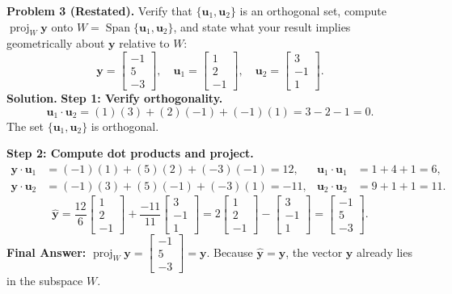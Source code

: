 \documentclass[11pt, letterpaper]{article}
\theoremstyle{definition}
\theoremstyle{remark}
\begin{document}
\medskip
\textbf{Problem 3 (Restated).} Verify that $\{\mathbf{u}_1, \mathbf{u}_2\}$ is an orthogonal set, compute $\operatorname{proj}_W \mathbf{y}$ onto $W = \operatorname{Span}\{\mathbf{u}_1, \mathbf{u}_2\}$, and state what your result implies geometrically about $\mathbf{y}$ relative to $W$:
\[
\mathbf{y} = \begin{bmatrix} -1 \\ 5 \\ -3 \end{bmatrix}, \quad \mathbf{u}_1 = \begin{bmatrix} 1 \\ 2 \\ -1 \end{bmatrix}, \quad \mathbf{u}_2 = \begin{bmatrix} 3 \\ -1 \\ 1 \end{bmatrix}.
\]
\textbf{Solution.}
\textbf{Step 1: Verify orthogonality.}
\[
\mathbf{u}_1 \cdot \mathbf{u}_2 = (1)(3) + (2)(-1) + (-1)(1) = 3 - 2 - 1 = 0.
\]
The set $\{\mathbf{u}_1, \mathbf{u}_2\}$ is orthogonal.

\textbf{Step 2: Compute dot products and project.}
\begin{align*}
\mathbf{y} \cdot \mathbf{u}_1 &= (-1)(1) + (5)(2) + (-3)(-1) = 12, & \mathbf{u}_1 \cdot \mathbf{u}_1 &= 1 + 4 + 1 = 6, \\
\mathbf{y} \cdot \mathbf{u}_2 &= (-1)(3) + (5)(-1) + (-3)(1) = -11, & \mathbf{u}_2 \cdot \mathbf{u}_2 &= 9 + 1 + 1 = 11.
\end{align*}
\[
\hat{\mathbf{y}} = \frac{12}{6}\begin{bmatrix} 1 \\ 2 \\ -1 \end{bmatrix} + \frac{-11}{11}\begin{bmatrix} 3 \\ -1 \\ 1 \end{bmatrix} = 2\begin{bmatrix} 1 \\ 2 \\ -1 \end{bmatrix} - \begin{bmatrix} 3 \\ -1 \\ 1 \end{bmatrix} = \begin{bmatrix} -1 \\ 5 \\ -3 \end{bmatrix}.
\]
\textbf{Final Answer:} $\operatorname{proj}_W \mathbf{y} = \begin{bmatrix} -1 \\ 5 \\ -3 \end{bmatrix} = \mathbf{y}$. Because $\hat{\mathbf{y}} = \mathbf{y}$, the vector $\mathbf{y}$ already lies in the subspace $W$.
\end{document}
